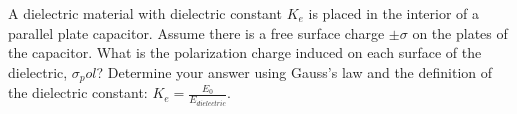 \documentclass[11pt,letterpaper,boxed]{hmcpset}
\begin{document}
\begin{solution}
\vfill
\end{solution}
\newpage

\begin{problem}
A dielectric material with dielectric constant $K_e$ is placed in the interior of a parallel plate capacitor. Assume there is a free surface charge $\pm \sigma$ on the plates of the capacitor. What is the polarization charge induced on each surface of the dielectric, $\sigma_pol$? Determine your answer using Gauss's law and the definition of the dielectric constant: $K_e = \frac{E_0}{E_{dielectric}}$.
\end{problem}

\begin{solution}
\vfill
\end{solution}
\newpage
\end{document}

